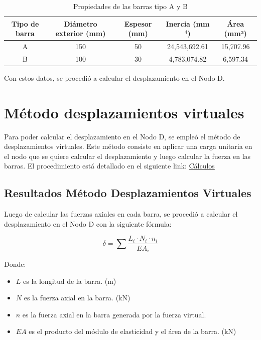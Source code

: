 \documentclass{article}  %
\begin{document}
\begin{table}[h!]
  \centering
  \begin{tabular}{ccccc}
  \hline
  \textbf{Tipo de barra} & \textbf{Diámetro exterior (mm)} & \textbf{Espesor (mm)} & \textbf{Inercia (mm\(^4\))} & \textbf{Área (mm²)} \\
  \hline
  A  & 150 & 50  & 24,543,692.61 & 15,707.96 \\
  B  & 100 & 30  & 4,783,074.82  & 6,597.34  \\
  \hline
  \end{tabular}
  \caption{Propiedades de las barras tipo A y B}
\end{table}
  
Con estos datos, se procedió a calcular el desplazamiento en el Nodo D.

\newpage
\section{Método desplazamientos virtuales}
Para poder calcular el desplazamiento en el Nodo D, se empleó el método de desplazamientos virtuales. Este método consiste en aplicar una carga unitaria en el nodo que se quiere calcular el desplazamiento y luego calcular la fuerza en las barras. El procedimiento está detallado en el siguiente link: \href{https://github.com/berckanala/P2E0_MCOC/tree/main/Excel}{Cálculos}

\subsection{Resultados Método Desplazamientos Virtuales}

Luego de calcular las fuerzas axiales en cada barra, se procedió a calcular el desplazamiento en el Nodo D con la siguiente fórmula:

\begin{equation}
  \delta = \sum \frac{L_i \cdot N_i \cdot n_i}{EA_i}
  \label{eq:1}
\end{equation}

Donde:
\begin{itemize}
  \item \(L\) es la longitud de la barra. (m)
  \item \(N\) es la fuerza axial en la barra. (kN)
  \item \(n\) es la fuerza axial en la barra generada por la fuerza virtual. 
  \item \(EA\) es el producto del módulo de elasticidad y el área de la barra. (kN)
\end{itemize}
\end{document}
